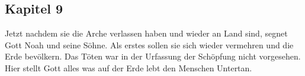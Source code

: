 \subsection{Kapitel 9}

Jetzt nachdem sie die Arche verlassen haben und wieder an Land sind, segnet Gott Noah und seine Söhne. Als erstes sollen sie sich wieder vermehren und die Erde bevölkern. Das Töten war in der Urfassung der Schöpfung nicht vorgesehen. Hier stellt Gott alles was auf der Erde lebt den Menschen Untertan. 
